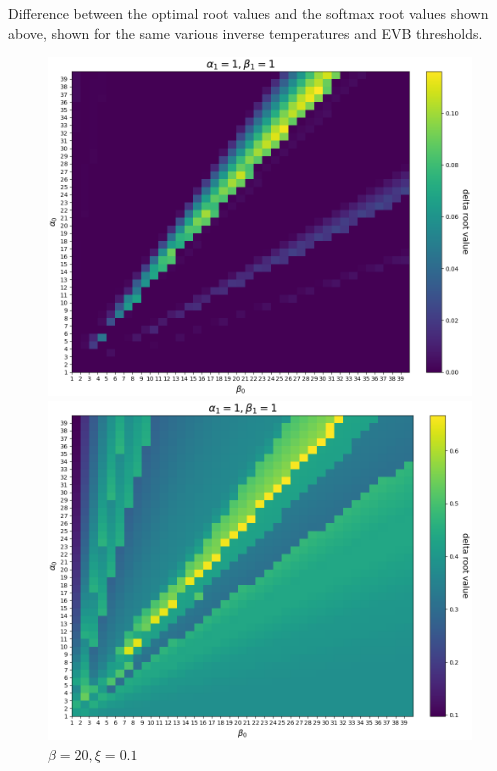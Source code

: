 \documentclass{article}
\begin{document}
\clearpage

Difference between the optimal root values and the softmax root values shown above, shown for the same various inverse temperatures and EVB thresholds.

\begin{figure}[ht!]
    \begin{minipage}{0.49\textwidth}
        \centering
        \includegraphics[width=1\textwidth]{../../../../bandit/data/convergence/num_replays/temp20/value_diff_horizon4_alpha1_beta1_xi0001_temp20.png}
        \caption{$\beta=20, \xi=0.001$}
    \end{minipage}%
    \begin{minipage}{0.49\textwidth}
        \centering
        \includegraphics[width=1\textwidth]{../../../../bandit/data/convergence/num_replays/temp20/value_diff_horizon4_alpha1_beta1_xi01_temp20.png}
        \caption{$\beta=20, \xi=0.1$}
    \end{minipage}
\end{figure}
\end{document}
